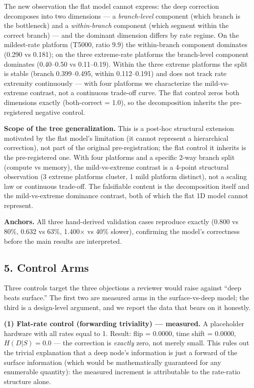 \documentclass[11pt]{article}
\begin{document}
{{{{The new observation the flat model cannot express: the deep correction decomposes into two dimensions --- a \emph{branch-level} component (which branch is the bottleneck) and a \emph{within-branch} component (which segment within the correct branch) --- and the dominant dimension differs by rate regime. On the mildest-rate platform (T5000, ratio 9.9) the within-branch component dominates (0.290 vs 0.181); on the three extreme-rate platforms the branch-level component dominates (0.40--0.50 vs 0.11--0.19). Within the three extreme platforms the split is stable (branch 0.399--0.495, within 0.112--0.191) and does not track rate extremity continuously --- with four platforms we characterize the mild-vs-extreme contrast, not a continuous trade-off curve. The flat control zeros both dimensions exactly (both-correct = 1.0), so the decomposition inherits the pre-registered negative control.

\textbf{Scope of the tree generalization.} This is a post-hoc structural extension motivated by the flat model's limitation (it cannot represent a hierarchical correction), not part of the original pre-registration; the flat control it inherits is the pre-registered one. With four platforms and a specific 2-way branch split (compute vs memory), the mild-vs-extreme contrast is a 4-point structural observation (3 extreme platforms cluster, 1 mild platform distinct), not a scaling law or continuous trade-off. The falsifiable content is the decomposition itself and the mild-vs-extreme dominance contrast, both of which the flat 1D model cannot represent.

\textbf{Anchors.} All three hand-derived validation cases reproduce exactly (0.800 vs 80\%, 0.632 vs 63\%, 1.400× vs 40\% slower), confirming the model's correctness before the main results are interpreted.

\subsection{5. Control Arms}\label{control-arms}

Three controls target the three objections a reviewer would raise against ``deep beats surface.'' The first two are measured arms in the surface-vs-deep model; the third is a design-level argument, and we report the data that bears on it honestly.

\textbf{(1) Flat-rate control (forwarding triviality) --- measured.} A placeholder hardware with all rates equal to 1. Result: flip = 0.0000, time shift = 0.0000, \(H(D|S) = 0.0\) --- the correction is \emph{exactly} zero, not merely small. This rules out the trivial explanation that a deep node's information is just a forward of the surface information (which would be mathematically guaranteed for any enumerable quantity): the measured increment is attributable to the rate-ratio structure alone.

}}}}
\end{document}
